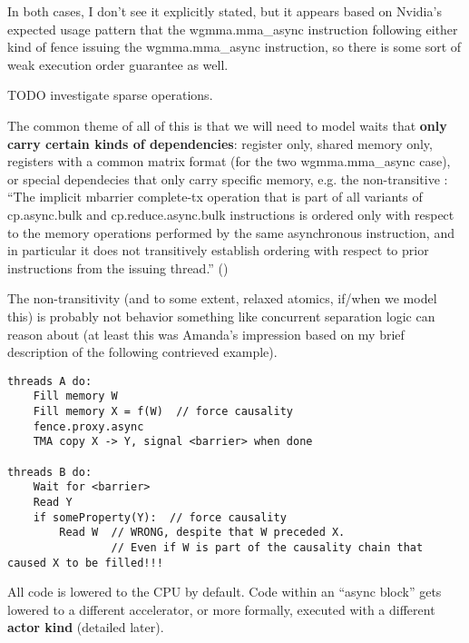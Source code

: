 \filbreak
In both cases, I don't see it explicitly stated, but it appears based on Nvidia's expected usage pattern that the wgmma.mma\_async instruction following either kind of fence  issuing the wgmma.mma\_async instruction, so there is some sort of weak execution order guarantee as well.

TODO investigate sparse operations.

\newpage
{}

The common theme of all of this is that we will need to model waits that \textbf{only carry certain kinds of dependencies}: register only, shared memory only, registers with a common matrix format (for the two wgmma.mma\_async case), or special dependecies that only carry specific memory, e.g. the non-transitive \completeTxOperation: ``The implicit mbarrier complete-tx operation that is part of all variants of cp.async.bulk and cp.reduce.async.bulk instructions is ordered only with respect to the memory operations performed by the same asynchronous instruction, and in particular it does not transitively establish ordering with respect to prior instructions from the issuing thread.'' ()

\filbreak
The non-transitivity (and to some extent, relaxed atomics, if/when we model this) is probably not behavior something like concurrent separation logic can reason about (at least this was Amanda's impression based on my brief description of the following contrieved example).

{
\color{lightttColor}
\begin{verbatim}
threads A do:
    Fill memory W
    Fill memory X = f(W)  // force causality
    fence.proxy.async
    TMA copy X -> Y, signal <barrier> when done

threads B do:
    Wait for <barrier>
    Read Y
    if someProperty(Y):  // force causality
        Read W  // WRONG, despite that W preceded X.
                // Even if W is part of the causality chain that caused X to be filled!!!
\end{verbatim}
}

\newpage
{}

 All code is lowered to the CPU by default.
Code within an ``async block'' gets lowered to a different accelerator, or more formally, executed with a different \textbf{actor kind} (detailed later).

